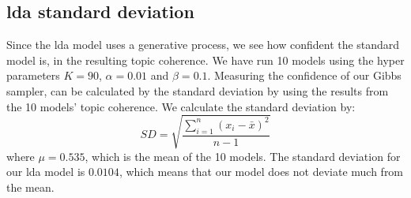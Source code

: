 \subsection{\gls{lda} standard deviation}\label{sec:std_dev}
Since the \gls{lda} model uses a generative process, we see how confident the standard model is, in the resulting topic coherence.
We have run 10 models using the hyper parameters $K=90$, $\alpha=0.01$ and $\beta=0.1$.
Measuring the confidence of our Gibbs sampler, can be calculated by the standard deviation by using the results from the 10 models' topic coherence.
We calculate the standard deviation by:
\begin{equation}
	SD = \sqrt{\frac{\sum_{i=1}^{n}(x_i-\bar{x})^2}{n-1}}
\end{equation}
where $\mu = 0.535$, which is the mean of the 10 models.
The standard deviation for our \gls{lda} model is $0.0104$, which means that our model does not deviate much from the mean.